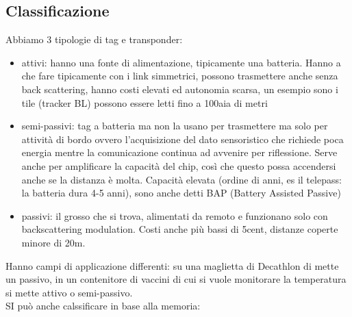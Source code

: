 \documentclass[oneside, 12pt]{extbook}
\begin{document}
\subsection{Classificazione}
Abbiamo 3 tipologie di tag e transponder:
\begin{itemize}
	\item attivi: hanno una fonte di alimentazione, tipicamente una batteria. Hanno a che fare tipicamente con i link simmetrici, possono trasmettere anche senza back scattering, hanno costi elevati ed autonomia scarsa, un esempio sono i tile (tracker BL) possono essere letti fino a 100aia di metri
	\item semi-passivi: tag a batteria ma non la usano per trasmettere ma solo per attività di bordo ovvero l'acquisizione del dato sensoristico che richiede poca energia mentre la comunicazione continua ad avvenire per riflessione. Serve anche per amplificare la capacità del chip, così che questo possa accendersi anche se la distanza è molta. Capacità elevata (ordine di anni, es il telepass: la batteria dura 4-5 anni), sono anche detti BAP (Battery Assisted Passive)
	\item passivi: il grosso che si trova, alimentati da remoto e funzionano solo con backscattering modulation. Costi anche più bassi di 5cent, distanze coperte minore di 20m.
\end{itemize}
Hanno campi di applicazione differenti: su una maglietta di Decathlon di mette un passivo, in un contenitore di vaccini di cui si vuole monitorare la temperatura si mette attivo o semi-passivo.\\SI può anche calssificare in base alla memoria:
\end{document}

